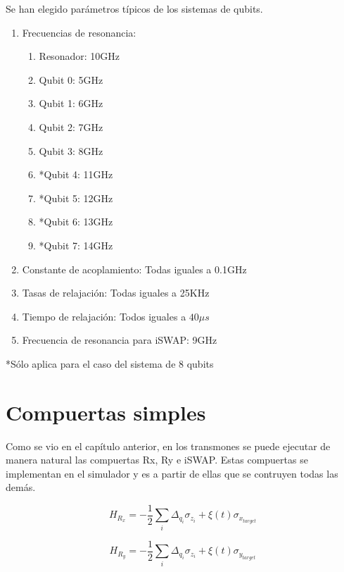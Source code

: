 Se han elegido parámetros típicos de los sistemas de qubits\cite{blais}.

\begin{enumerate}
    \item Frecuencias de resonancia:
        \begin{enumerate}
            \item Resonador: 10GHz
            \item Qubit 0: 5GHz
            \item Qubit 1: 6GHz
            \item Qubit 2: 7GHz
            \item Qubit 3: 8GHz
            \item *Qubit 4: 11GHz
            \item *Qubit 5: 12GHz
            \item *Qubit 6: 13GHz
            \item *Qubit 7: 14GHz
        \end{enumerate}
    \item Constante de acoplamiento: Todas iguales a 0.1GHz
    \item Tasas de relajación: Todas iguales a 25KHz
    \item Tiempo de relajación: Todos iguales a $40 \mu s$
    \item Frecuencia de resonancia para iSWAP: 9GHz
\end{enumerate}

*Sólo aplica para el caso del sistema de 8 qubits

\section{Compuertas simples}

Como se vio en el capítulo anterior, en los transmones se puede ejecutar de manera natural las compuertas Rx, Ry e iSWAP. Estas compuertas se implementan en el simulador y es a partir de ellas que se contruyen todas las demás.

\begin{equation}
    H_{R_x} = -\frac{1}{2} \sum\limits_i \Delta_{q_i} \sigma_{z_i} + \xi(t) \sigma_{x_{target}}
\end{equation}

\begin{equation}
    H_{R_y} = -\frac{1}{2} \sum\limits_i \Delta_{q_i} \sigma_{z_i} + \xi(t) \sigma_{y_{target}}
\end{equation}

